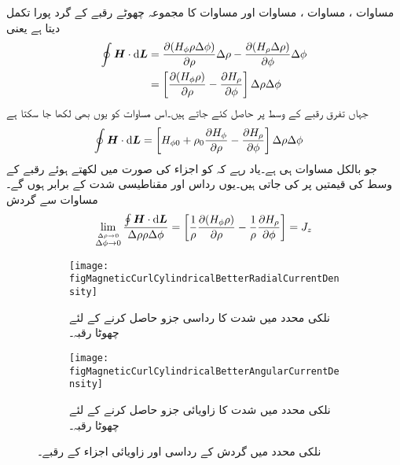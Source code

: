 مساوات ، مساوات ، مساوات  اور مساوات  کا مجموعہ چھوٹے رقبے کے گرد پورا تکمل دیتا ہے یعنی
\begin{gather}
\begin{aligned}\label{مساوات_مقناطیسی_نلکی_پہلا_بند_تکمل_دوبارہ}
\oint \kvec{H} \cdot \dif \kvec{L}&=\frac{\partial (H_{\phi}\rho \Delta \phi)}{\partial \rho}\Delta \rho-\frac{\partial (H_{\rho} \Delta \rho)}{\partial \phi}\Delta \phi\\
&=\left[\frac{\partial (H_{\phi}\rho )}{\partial \rho}-\frac{\partial H_{\rho}}{\partial \phi}\right] \Delta \rho\Delta \phi
\end{aligned}
\end{gather}
جہاں تفرق رقبے کے وسط پر حاصل کئے جاتے ہیں۔اس مساوات کو یوں بھی لکھا جا سکتا ہے
\begin{align*}
\oint \kvec{H} \cdot \dif \kvec{L}&=\left[H_{\phi 0} +\rho_0 \frac{\partial H_{\phi}}{\partial \rho}-\frac{\partial H_{\rho}}{\partial \phi}\right] \Delta \rho\Delta \phi
\end{align*}
جو بالکل مساوات  ہی ہے۔یاد رہے کہ  کو اجزاء کی صورت میں لکھتے ہوئے رقبے کے وسط کی قیمتیں پر کی جاتی ہیں۔یوں رداس   اور مقناطیسی شدت  کے برابر ہوں گے۔مساوات  سے گردش
\begin{align}\label{مساوات_مقناطیسی_رداسی_ذ_گردش}
\lim_{\overset{\Delta \rho \to 0}{\Delta \phi \to 0}} \frac{\oint \kvec{H} \cdot \dif \kvec{L}}{\Delta \rho \rho \Delta \phi}=\left[\frac{1}{\rho}\frac{\partial (H_{\phi}\rho )}{\partial \rho}-\frac{1}{\rho}\frac{\partial H_{\rho}}{\partial \phi}\right] =J_z
\end{align}

\begin{figure}
\centering
\begin{subfigure}{0.5\textwidth}
\centering
\texttt{[image: figMagneticCurlCylindricalBetterRadialCurrentDensity]}
\caption{نلکی محدد میں شدت کا رداسی جزو حاصل کرنے کے لئے چھوٹا رقبہ۔}
\end{subfigure}%
%
\begin{subfigure}{0.5\textwidth}
\centering
\texttt{[image: figMagneticCurlCylindricalBetterAngularCurrentDensity]}
\caption{نلکی محدد میں شدت کا زاویائی جزو حاصل کرنے کے لئے چھوٹا رقبہ۔}
\end{subfigure}%
\caption{نلکی محدد میں گردش کے رداسی اور زاویائی اجزاء کے رقبے۔}
\label{شکل_مقناطیسی_نلکی_رداسی}
\end{figure}

